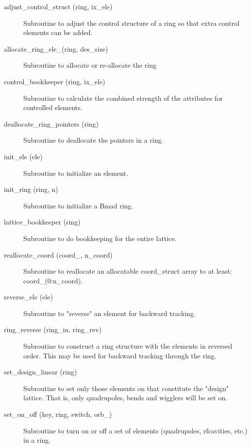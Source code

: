 \begin{description}

\item[adjust\_control\_struct (ring, ix\_ele)] \Newline
Subroutine to adjust the control structure of a ring so that 
extra control elements can be added. 

\item[allocate\_ring\_ele\_(ring, des\_size)] \Newline 
Subroutine to allocate or re-allocate the ring%

\item[control\_bookkeeper (ring, ix\_ele)] \Newline
Subroutine to calculate the combined strength of the attributes for
controlled elements.

\item[deallocate\_ring\_pointers (ring)] \Newline 
Subroutine to deallocate the pointers in a ring.

\item[init\_ele (ele)] \Newline
Subroutine to initialize an element. 

\item[init\_ring (ring, n)] \Newline 
Subroutine to initialize a Bmad ring.

\item[lattice\_bookkeeper (ring)] \Newline 
Subroutine to do bookkeeping for the entire lattice.

\item[reallocate\_coord (coord\_, n\_coord)] \Newline 
Subroutine to reallocate an allocatable  coord\_struct array to at least:
coord\_(0:n\_coord).

\item[reverse\_ele (ele)] \Newline
Subroutine to "reverse" an element for backward tracking. 

\item[ring\_reverse (ring\_in, ring\_rev)] \Newline
Subroutine to construct a ring structure with the elements in reversed 
order. This may be used for backward tracking through the ring. 

\item[set\_design\_linear (ring)] \Newline
Subroutine to set only those elements on that constitute the "design" 
lattice. That is, only quadrupoles, bends and wigglers will be set on. 

\item[set\_on\_off (key, ring, switch, orb\_)] \Newline
Subroutine to turn on or off a set of elements (quadrupoles,
rfcavities, etc.) in a ring.


\end{description}
